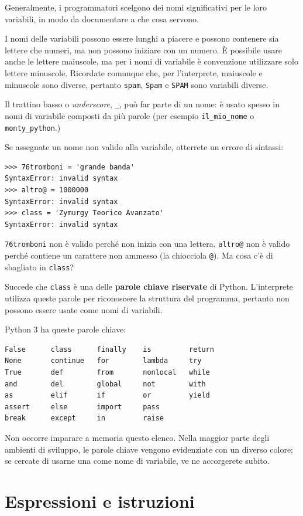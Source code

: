 \documentclass[10pt]{book}
\begin{document}
Generalmente, i programmatori scelgono dei nomi significativi per le loro variabili, in modo da documentare a che cosa servono.

I nomi delle variabili possono essere lunghi a piacere e possono contenere sia lettere che numeri, ma non possono iniziare con un numero. È possibile usare anche le lettere maiuscole, ma per i nomi di variabile è convenzione utilizzare solo lettere minuscole. Ricordate comunque che, per l'interprete, maiuscole e minuscole sono diverse, pertanto \verb"spam", \verb"Spam" e \verb"SPAM" sono variabili diverse.

Il trattino basso o {\em underscore}, \verb"_", può far parte di un nome: è usato spesso in nomi di variabile composti da più parole (per esempio 
\verb"il_mio_nome" o \verb"monty_python".)

Se assegnate un nome non valido alla variabile, otterrete un errore di sintassi:

\begin{verbatim}
>>> 76tromboni = 'grande banda'
SyntaxError: invalid syntax
>>> altro@ = 1000000
SyntaxError: invalid syntax
>>> class = 'Zymurgy Teorico Avanzato'
SyntaxError: invalid syntax
\end{verbatim}
%
{\tt 76tromboni} non è valido perché non inizia con una lettera.
{\tt altro@} non è valido perché contiene un carattere non ammesso (la chiocciola {\tt @}). Ma cosa c'è di sbagliato in {\tt class}?

Succede che {\tt class} è una delle {\bf parole chiave riservate} di Python. L'interprete utilizza queste parole per riconoscere la struttura del programma, pertanto non possono essere usate come nomi di variabili.

Python 3 ha queste parole chiave:

\begin{verbatim}
False      class      finally    is         return
None       continue   for        lambda     try
True       def        from       nonlocal   while
and        del        global     not        with
as         elif       if         or         yield
assert     else       import     pass
break      except     in         raise
\end{verbatim}
%
Non occorre imparare a memoria questo elenco. Nella maggior parte degli ambienti di sviluppo, le parole chiave vengono evidenziate con un diverso colore; se cercate di usarne una come nome di variabile, ve ne accorgerete subito.


\section{Espressioni e istruzioni}
\end{document}
